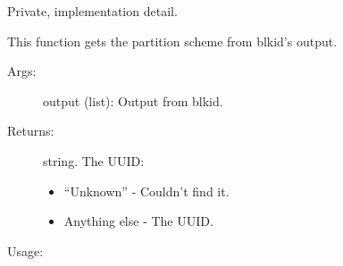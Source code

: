 \documentclass[letterpaper,10pt,english]{sphinxmanual}
\begin{document}
\begin{fulllineitems}
\label{\detokenize{cygwin:getdevinfo.cygwin.get_uuid}}
Private, implementation detail.

This function gets the partition scheme from
blkid’s output.
\begin{description}
\item[{Args:}] \leavevmode
output (list):   Output from blkid.

\item[{Returns:}] \leavevmode
string. The UUID:
\begin{itemize}
\item {} 
“Unknown”     - Couldn’t find it.

\item {} 
Anything else - The UUID.

\end{itemize}

\end{description}

Usage:

\begin{sphinxVerbatim}[commandchars=\\\{\}]
  
\end{sphinxVerbatim}

\end{fulllineitems}

\end{document}

